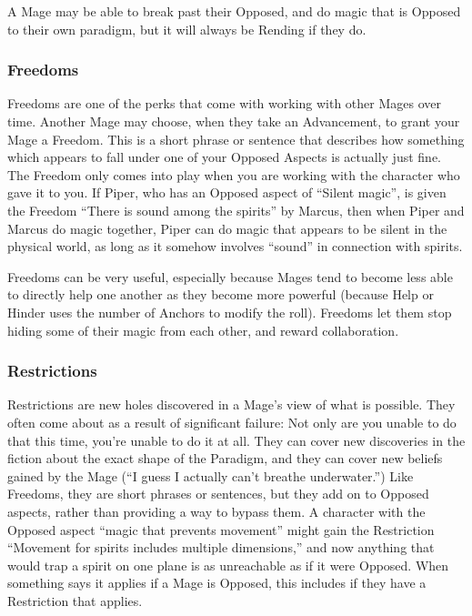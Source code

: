 \documentclass[
]{article}
\begin{document}
A Mage may be able to break past their Opposed, and do magic that is
Opposed to their own paradigm, but it will always be Rending if they do.

\hypertarget{freedoms}{%
\subsubsection{Freedoms}\label{freedoms}}

Freedoms are one of the perks that come with working with other Mages
over time. Another Mage may choose, when they take an Advancement, to
grant your Mage a Freedom. This is a short phrase or sentence that
describes how something which appears to fall under one of your Opposed
Aspects is actually just fine. The Freedom only comes into play when you
are working with the character who gave it to you. If Piper, who has an
Opposed aspect of ``Silent magic'', is given the Freedom ``There is
sound among the spirits'' by Marcus, then when Piper and Marcus do magic
together, Piper can do magic that appears to be silent in the physical
world, as long as it somehow involves ``sound'' in connection with
spirits.

Freedoms can be very useful, especially because Mages tend to become
less able to directly help one another as they become more powerful
(because Help or Hinder uses the number of Anchors to modify the roll).
Freedoms let them stop hiding some of their magic from each other, and
reward collaboration.

\hypertarget{restrictions}{%
\subsubsection{Restrictions}\label{restrictions}}

Restrictions are new holes discovered in a Mage's view of what is
possible. They often come about as a result of significant failure: Not
only are you unable to do that this time, you're unable to do it at all.
They can cover new discoveries in the fiction about the exact shape of
the Paradigm, and they can cover new beliefs gained by the Mage (``I
guess I actually can't breathe underwater.'') Like Freedoms, they are
short phrases or sentences, but they add on to Opposed aspects, rather
than providing a way to bypass them. A character with the Opposed aspect
``magic that prevents movement'' might gain the Restriction ``Movement
for spirits includes multiple dimensions,'' and now anything that would
trap a spirit on one plane is as unreachable as if it were Opposed. When
something says it applies if a Mage is Opposed, this includes if they
have a Restriction that applies.
\end{document}
